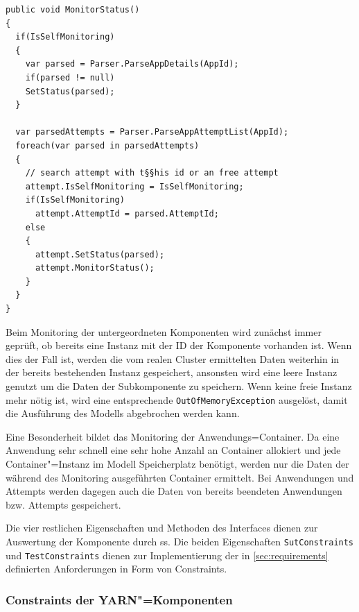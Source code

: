 \begin{lstlisting}[label=lst:monitorAppStatus,style=cs,
caption={[Implementierung der Methode MonitorStatus() in der Klasse YarnApp]
    Implementierung der Methode \texttt{MonitorStatus()} in der Klasse \texttt{YarnApp} (gekürzt).
    Das Monitoring der anderen Komponenten erfolgt analog hierzu.}]
public void MonitorStatus()
{
  if(IsSelfMonitoring)
  {
    var parsed = Parser.ParseAppDetails(AppId);
    if(parsed != null)
    SetStatus(parsed);
  }
  
  var parsedAttempts = Parser.ParseAppAttemptList(AppId);
  foreach(var parsed in parsedAttempts)
  {
    // search attempt with t§§his id or an free attempt
    attempt.IsSelfMonitoring = IsSelfMonitoring;
    if(IsSelfMonitoring)
      attempt.AttemptId = parsed.AttemptId;
    else
    {
      attempt.SetStatus(parsed);
      attempt.MonitorStatus();
    }
  }
}
\end{lstlisting}

Beim Monitoring der untergeordneten Komponenten wird zunächst immer geprüft, ob bereits eine Instanz mit der ID der Komponente vorhanden ist.
Wenn dies der Fall ist, werden die vom realen Cluster ermittelten Daten weiterhin in der bereits bestehenden Instanz gespeichert, ansonsten wird eine leere Instanz genutzt um die Daten der Subkomponente zu speichern.
Wenn keine freie Instanz mehr nötig ist, wird eine entsprechende \texttt{OutOfMemoryException} ausgelöst, damit die Ausführung des Modells abgebrochen werden kann.

Eine Besonderheit bildet das Monitoring der Anwendungs=Container.
Da eine Anwendung sehr schnell eine sehr hohe Anzahl an Container allokiert und jede Container"=Instanz im Modell Speicherplatz benötigt, werden nur die Daten der während des Monitoring ausgeführten Container ermittelt.
Bei Anwendungen und Attempts werden dagegen auch die Daten von bereits beendeten Anwendungen bzw. Attempts gespeichert.

Die vier restlichen Eigenschaften und Methoden des Interfaces dienen zur Auswertung der Komponente durch \ac{ss}.
Die beiden Eigenschaften \texttt{SutConstraints} und \texttt{TestConstraints} dienen zur Implementierung der in \cref{sec:requirements} definierten Anforderungen in Form von Constraints.

\subsubsection{Constraints der \acs{YARN}"=Komponenten}
\label{subsubsec:yarnComponentConstraints}

